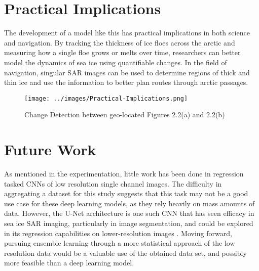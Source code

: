 \section{Practical Implications}
The development of a model like this has practical implications in both science and navigation. By tracking the thickness of ice floes across the arctic and measuring how a single floe grows or melts over time, researchers can better model the dynamics of sea ice using quantifiable changes. In the field of navigation, singular SAR images can be used to determine regions of thick and thin ice and use the information to better plan routes through arctic passages. 
\begin{figure}[h]
	\centering
	\texttt{[image: ../images/Practical-Implications.png]}
	\caption[Implications of LiDAR mapped SAR]{Change Detection between geo-located Figures 2.2(a) and 2.2(b)}
	\label{fig:change-detection}
\end{figure}


\section{Future Work}
As mentioned in the experimentation, little work has been done in regression tasked CNNs of low resolution single channel images. The difficulty in aggregating a dataset for this study suggests that this task may not be a good use case for these deep learning models, as they rely heavily on mass amounts of data. However, the U-Net architecture is one such CNN that has seen efficacy in sea ice SAR imaging, particularly in image segmentation, and could be explored in its regression capabilities on lower-resolution images \cite{SAR-U-Net}. Moving forward, pursuing ensemble learning through a more statistical approach of the low resolution data would be a valuable use of the obtained data set, and possibly more feasible than a deep learning model.
